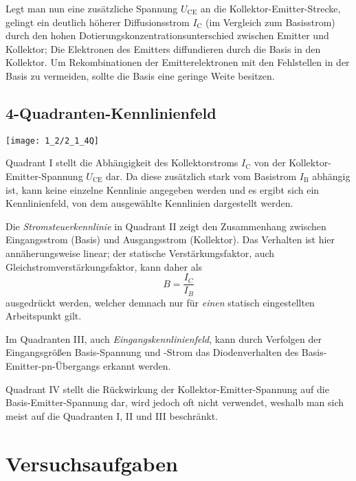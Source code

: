 \documentclass[a4paper, 12pt]{article}
\begin{document}
Legt man nun eine zusätzliche Spannung $U_\textrm{CE}$ an die
Kollektor-Emitter-Strecke, gelingt ein deutlich höherer Diffusionsstrom $I_\textrm{C}$ (im
Vergleich zum Basisstrom) durch den hohen Dotierungskonzentrationsunterschied
zwischen Emitter und Kollektor; Die Elektronen des Emitters diffundieren durch
die Basis in den
Kollektor. Um Rekombinationen der Emitterelektronen mit den Fehlstellen in der Basis
zu vermeiden, sollte die Basis eine geringe Weite besitzen.

\subsection{4-Quadranten-Kennlinienfeld}

\begin{center}
  \texttt{[image: 1\_2/2\_1\_4Q]}
\end{center}

Quadrant I stellt die Abhängigkeit des Kollektorstroms $I_{\textrm{C}}$ von der
Kollektor-Emitter-Spannung $U_{\textrm{CE}}$ dar. Da diese zusätzlich stark vom
Basistrom $I_{\textrm{B}}$ abhängig ist, kann keine einzelne Kennlinie
angegeben werden und es ergibt sich ein Kennlinienfeld, von dem ausgewählte
Kennlinien dargestellt werden.

Die \emph{Stromsteuerkennlinie} in Quadrant II zeigt den Zusammenhang
zwischen Eingangsstrom (Basis) und Ausgangsstrom (Kollektor). Das
Verhalten ist hier annäherungsweise linear; der statische Verstärkungsfaktor,
auch Gleichstromverstärkungsfaktor, kann daher als
$$B = \frac{I_C}{I_B}$$
ausgedrückt werden, welcher demnach nur für \textit{einen} statisch eingestellten Arbeitspunkt gilt. 

Im Quadranten III, auch \emph{Eingangskennlinienfeld}, kann durch Verfolgen der Eingangsgrößen Basis-Spannung und -Strom das
Diodenverhalten des Basis-Emitter-pn-Übergangs erkannt werden.

Quadrant IV stellt die Rückwirkung der Kollektor-Emitter-Spannung auf
die Basis-Emitter-Spannung dar, wird jedoch oft nicht verwendet, weshalb man
sich meist auf die Quadranten I, II und III beschränkt.


\pagebreak

  \clearpage
\setcounter{page}{1}

\setcounter{section}{0}
\section{Versuchsaufgaben}
\end{document}
